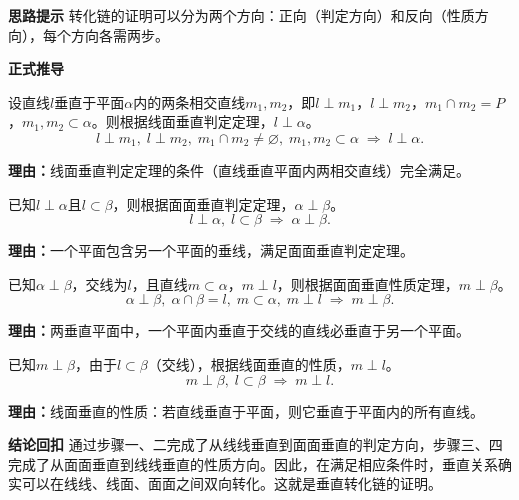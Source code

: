 \begin{proofbox}
	\textbf{\textcolor{CProof}{思路提示}}
	转化链的证明可以分为两个方向：正向（判定方向）和反向（性质方向），每个方向各需两步。

	\medskip
	\textbf{\textcolor{CProof}{正式推导}}
	\begin{description}[style=nextline, leftmargin=2.8em, labelsep=0.5em, itemsep=0.55em]
		\item[\textbf{步骤一（线线推线面判定）：}]
			设直线$l$垂直于平面$\alpha$内的两条相交直线$m_1,m_2$，即$l\perp m_1$，$l\perp m_2$，$m_1\cap m_2=P$，$m_1,m_2\subset\alpha$。则根据线面垂直判定定理，$l\perp\alpha$。
			\[
				l\perp m_1,\; l\perp m_2,\; m_1\cap m_2\neq\varnothing,\; m_1,m_2\subset\alpha \;\Rightarrow\; l\perp\alpha.
			\]
			\par\textbf{理由：}线面垂直判定定理的条件（直线垂直平面内两相交直线）完全满足。
		\item[\textbf{步骤二（线面推面面判定）：}]
			已知$l\perp\alpha$且$l\subset\beta$，则根据面面垂直判定定理，$\alpha\perp\beta$。
			\[
				l\perp\alpha,\; l\subset\beta \;\Rightarrow\; \alpha\perp\beta.
			\]
			\par\textbf{理由：}一个平面包含另一个平面的垂线，满足面面垂直判定定理。
		\item[\textbf{步骤三（面面推线面性质）：}]
			已知$\alpha\perp\beta$，交线为$l$，且直线$m\subset\alpha$，$m\perp l$，则根据面面垂直性质定理，$m\perp\beta$。
			\[
				\alpha\perp\beta,\; \alpha\cap\beta=l,\; m\subset\alpha,\; m\perp l \;\Rightarrow\; m\perp\beta.
			\]
			\par\textbf{理由：}两垂直平面中，一个平面内垂直于交线的直线必垂直于另一个平面。
		\item[\textbf{步骤四（线面推线线性质）：}]
			已知$m\perp\beta$，由于$l\subset\beta$（交线），根据线面垂直的性质，$m\perp l$。
			\[
				m\perp\beta,\; l\subset\beta \;\Rightarrow\; m\perp l.
			\]
			\par\textbf{理由：}线面垂直的性质：若直线垂直于平面，则它垂直于平面内的所有直线。
	\end{description}

	\medskip
	\textbf{\textcolor{CProof}{结论回扣}}
	通过步骤一、二完成了从线线垂直到面面垂直的判定方向，步骤三、四完成了从面面垂直到线线垂直的性质方向。因此，在满足相应条件时，垂直关系确实可以在线线、线面、面面之间双向转化。这就是垂直转化链的证明。
\end{proofbox}
